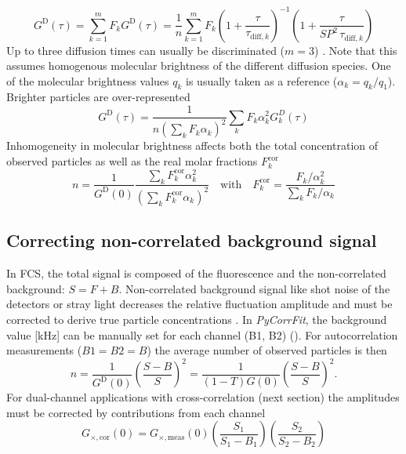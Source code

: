 	\begin{equation}
	\label{eq14}
	G^{\mathrm{D}}(\tau) = \sum_{k=1}^m F_k G^{\mathrm{D}}(\tau) = \frac{1}{n} \sum_{k=1}^m F_k \left(1+\frac{\tau}{\tau_{{\mathrm{diff}},k}} \right) ^{-1} \left(1+\frac{\tau}{\textit{SP}^2 \, \tau_{{\mathrm{diff}},k}} \right)
	\end{equation}
Up to three diffusion times can usually be discriminated ($m = 3$) \cite{Meseth1999}. Note that this assumes homogenous molecular brightness of the different diffusion species. One of the molecular brightness values $q_k$ is usually taken as a reference ($\alpha_k = q_k/q_1$). Brighter particles are over-represented \cite{Thompson1991}
	\begin{equation}
	\label{eq15}
	G^{\mathrm{D}}(\tau) = \frac{1}{n \left( \sum_k F_k \alpha_k \right)^2} \sum_k F_k \alpha_k^2 G_k^D(\tau)
	\end{equation}
Inhomogeneity in molecular brightness affects both the total concentration of observed particles as well as the real molar fractions $F_k^{\mathrm{cor}}$ \cite{Thompson1991}
	\begin{equation}
	\label{eq16}
	n = \frac{1}{G^{\mathrm{D}}(0)} \frac{\sum_k F_k^{\mathrm{cor}} \alpha_k^2}{\left( \sum_k F_k^{\mathrm{cor}} \alpha_k \right)^2} \quad\mbox {with} \quad F_k^{\mathrm{cor}} = \frac{F_k/\alpha_k^2}{\sum_k F_k/\alpha_k}
	\end{equation}

\subsection{Correcting non-correlated background signal}
\label{sec:theor.correc}
In FCS, the total signal is composed of the fluorescence and the non-correlated background: $S = F + B$. Non-correlated background signal like shot noise of the detectors or stray light decreases the relative fluctuation amplitude and must be corrected to derive true particle concentrations \cite{Koppel1974,Thompson1991}. In \textit{PyCorrFit}, the background value [kHz] can be manually set for each channel (B1, B2) (). For autocorrelation measurements ($B1 = B2 = B$) the average number of observed particles is then
	\begin{equation}
	\label{eq17}
	n = \frac{1}{G^{\mathrm{D}}(0)} \left( \frac{S-B}{S} \right)^2 = \frac{1}{(1-T)G(0)} \left( \frac{S-B}{S} \right)^2.
	\end{equation}
For dual-channel applications with cross-correlation (next section) the amplitudes must be corrected by contributions from each channel \cite{Weidemann2013}
	\begin{equation}
	\label{eq18}
	G_{\times,\mathrm{cor}}(0) = G_{\times, \mathrm{meas}}(0) \left( \frac{S_1}{S_1-B_1} \right) \left( \frac{S_2}{S_2-B_2} \right) 
	\end{equation}

